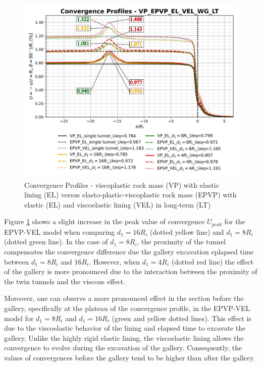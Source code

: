 \documentclass[a4paper,fleqn]{cas-sc}
\begin{document}
\begin{figure}[h!]
	\centering
	\includegraphics[scale=0.6]{Convergence Profiles - VP_EPVP_EL_VEL_WG_LT.pdf}
	\caption{Convergence Profiles - viscoplastic rock mass (VP) with elastic lining (EL) versus elasto-plastic-viscoplastic rock mass (EPVP) with elastic (EL) and viscoelastic lining (VEL) in long-term (LT)}
	\label{VP-EL-EPVP-VEL-WG-LT}
\end{figure}
\FloatBarrier

Figure \ref{VP-EL-EPVP-VEL-WG-LT} shows a slight increase in the peak value of convergence $U_{peak}$ for the EPVP-VEL model when comparing $d_1 = 16R_i$ (dotted yellow line) and $d_1 = 8R_i$ (dotted green line). In the case of $d_1 = 8R_i$, the proximity of the tunnel compensates the convergence difference due the gallery excavation eplapsed time between $d_1 = 8R_i$ and $16 R_i$. However, when $d_1 = 4R_i$ (dotted red line) the effect of the gallery is more pronounced due to the interaction between the proximity of the twin tunnels and the viscous effect. 

Moreover, one can observe a more pronounced effect in the section before the gallery, specifically at the plateau of the convergence profile, in the EPVP-VEL model for $d_1 = 8R_i$ and $d_1 = 16R_i$ (green and yellow dotted lines). This effect is due to the viscoelastic behavior of the lining and elapsed time to excavate the gallery. Unlike the highly rigid elastic lining, the viscoelastic lining allows the convergence to evolve during the excavation of the gallery. Consequently, the values of convergences before the gallery tend to be higher than after the gallery.
\end{document}
